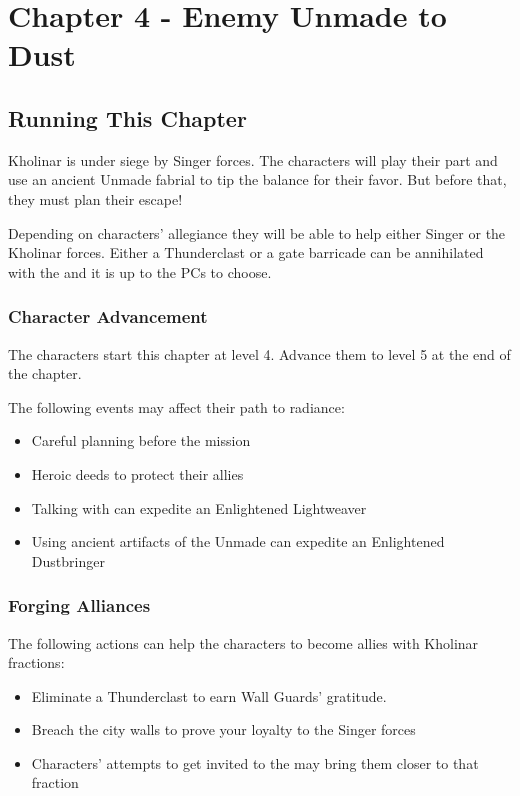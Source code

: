 \chapter{Chapter 4 - Enemy Unmade to Dust}
\label{chap:chapter4}

\setcounter{section}{-1}
\section{Running This Chapter}

Kholinar is under siege by Singer forces. The characters will play their part and use an ancient Unmade fabrial to tip the balance for their favor. But before that, they must plan their escape!

Depending on characters' allegiance they will be able to help either Singer or the Kholinar forces. Either a Thunderclast or a gate barricade can be annihilated with the \lootDustcaster{} and it is up to the PCs to choose.

\subsection{Character Advancement}

The characters start this chapter at level 4. Advance them to level 5 at the end of the chapter.

The following events may affect their path to radiance:
\begin{itemize}
	\item Careful planning before the mission
	\item Heroic deeds to protect their allies
	\item Talking with \npcSjaAnat can expedite an Enlightened Lightweaver
	\item Using ancient artifacts of the Unmade can expedite an Enlightened Dustbringer
\end{itemize}



\subsection{Forging Alliances}

The following actions can help the characters to become allies with Kholinar fractions:
\begin{itemize}
	\item Eliminate a Thunderclast to earn Wall Guards' gratitude.
	\item Breach the city walls to prove your loyalty to the Singer forces
	\item Characters' attempts to get invited to the \npcFractionCult{} may bring them closer to that fraction
\end{itemize}



